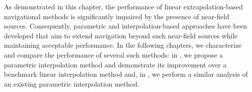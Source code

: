 As demonstrated in this chapter, the performance of linear extrapolation-based navigational methods is significantly impaired by the presence of near-field sources.
Consequently, parametric and interpolation-based approaches have been developed that aim to extend navigation beyond such near-field sources while maintaining acceptable performance.
In the following chapters, we characterize and compare the performance of several such methods:
in , we propose a parametric interpolation method and demonstrate its improvement over a benchmark linear interpolation method and,
in , we perform a similar analysis of an existing parametric interpolation method.
